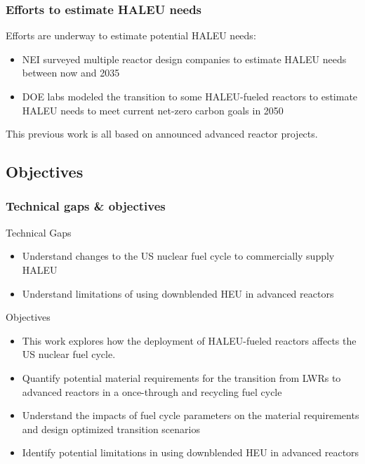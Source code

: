 \begin{frame}
    \frametitle{Efforts to estimate HALEU needs}
    Efforts are underway to estimate potential \gls{HALEU} needs:
    \begin{itemize}
        \item \gls{NEI} surveyed multiple reactor design companies
              to estimate \gls{HALEU} needs between now and 2035 
              \cite{korsnick_updated_2021,nuclear_energy_institute_establishing_2022}
        \item \gls{DOE} labs modeled the transition to some 
              \gls{HALEU}-fueled reactors to estimate \gls{HALEU} needs 
              to meet current net-zero carbon goals in 2050 \cite{dixon_estimated_2022}
    \end{itemize}
    This previous work is all based on announced advanced reactor projects.
\end{frame}

\subsection{Objectives}
\begin{frame}
    \frametitle{Technical gaps \& objectives}
    \begin{block}{Technical Gaps}
        \begin{itemize}
            \item Understand changes to the US nuclear fuel cycle to 
                  commercially supply \gls{HALEU}
            \item Understand limitations of using downblended \gls{HEU} 
                  in advanced reactors         
        \end{itemize}
    \end{block}
    \pause
    \begin{block}{Objectives}
        \begin{itemize}
        \item<2-> This work explores how the deployment of \gls{HALEU}-fueled reactors 
        affects the US nuclear fuel cycle. 
        \item<2-> Quantify potential material requirements for the transition from 
              \glspl{LWR} to advanced reactors in a once-through and recycling 
              fuel cycle
        \item<2-> Understand the impacts of fuel cycle parameters on the 
              material requirements and design optimized transition scenarios
        \item<2-> Identify potential limitations in using downblended \gls{HEU} 
              in advanced reactors
        \end{itemize}
    \end{block}
\end{frame}